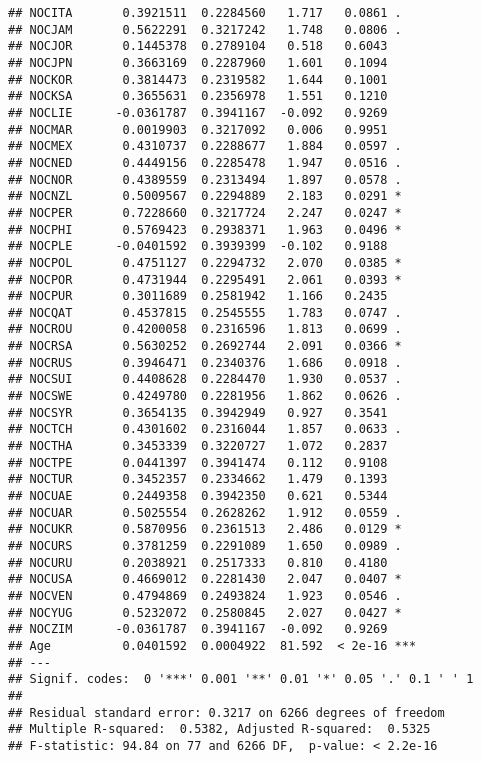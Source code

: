 \documentclass[]{article}
\begin{document}
\begin{verbatim}
## NOCITA       0.3921511  0.2284560   1.717   0.0861 .  
## NOCJAM       0.5622291  0.3217242   1.748   0.0806 .  
## NOCJOR       0.1445378  0.2789104   0.518   0.6043    
## NOCJPN       0.3663169  0.2287960   1.601   0.1094    
## NOCKOR       0.3814473  0.2319582   1.644   0.1001    
## NOCKSA       0.3655631  0.2356978   1.551   0.1210    
## NOCLIE      -0.0361787  0.3941167  -0.092   0.9269    
## NOCMAR       0.0019903  0.3217092   0.006   0.9951    
## NOCMEX       0.4310737  0.2288677   1.884   0.0597 .  
## NOCNED       0.4449156  0.2285478   1.947   0.0516 .  
## NOCNOR       0.4389559  0.2313494   1.897   0.0578 .  
## NOCNZL       0.5009567  0.2294889   2.183   0.0291 *  
## NOCPER       0.7228660  0.3217724   2.247   0.0247 *  
## NOCPHI       0.5769423  0.2938371   1.963   0.0496 *  
## NOCPLE      -0.0401592  0.3939399  -0.102   0.9188    
## NOCPOL       0.4751127  0.2294732   2.070   0.0385 *  
## NOCPOR       0.4731944  0.2295491   2.061   0.0393 *  
## NOCPUR       0.3011689  0.2581942   1.166   0.2435    
## NOCQAT       0.4537815  0.2545555   1.783   0.0747 .  
## NOCROU       0.4200058  0.2316596   1.813   0.0699 .  
## NOCRSA       0.5630252  0.2692744   2.091   0.0366 *  
## NOCRUS       0.3946471  0.2340376   1.686   0.0918 .  
## NOCSUI       0.4408628  0.2284470   1.930   0.0537 .  
## NOCSWE       0.4249780  0.2281956   1.862   0.0626 .  
## NOCSYR       0.3654135  0.3942949   0.927   0.3541    
## NOCTCH       0.4301602  0.2316044   1.857   0.0633 .  
## NOCTHA       0.3453339  0.3220727   1.072   0.2837    
## NOCTPE       0.0441397  0.3941474   0.112   0.9108    
## NOCTUR       0.3452357  0.2334662   1.479   0.1393    
## NOCUAE       0.2449358  0.3942350   0.621   0.5344    
## NOCUAR       0.5025554  0.2628262   1.912   0.0559 .  
## NOCUKR       0.5870956  0.2361513   2.486   0.0129 *  
## NOCURS       0.3781259  0.2291089   1.650   0.0989 .  
## NOCURU       0.2038921  0.2517333   0.810   0.4180    
## NOCUSA       0.4669012  0.2281430   2.047   0.0407 *  
## NOCVEN       0.4794869  0.2493824   1.923   0.0546 .  
## NOCYUG       0.5232072  0.2580845   2.027   0.0427 *  
## NOCZIM      -0.0361787  0.3941167  -0.092   0.9269    
## Age          0.0401592  0.0004922  81.592  < 2e-16 ***
## ---
## Signif. codes:  0 '***' 0.001 '**' 0.01 '*' 0.05 '.' 0.1 ' ' 1
## 
## Residual standard error: 0.3217 on 6266 degrees of freedom
## Multiple R-squared:  0.5382, Adjusted R-squared:  0.5325 
## F-statistic: 94.84 on 77 and 6266 DF,  p-value: < 2.2e-16
\end{verbatim}
\end{document}
